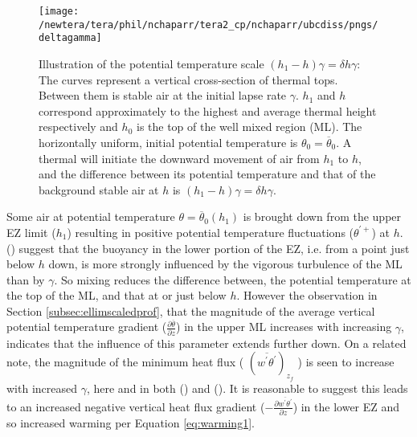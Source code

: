 \begin{figure}[htbp]
    \centering
    \texttt{[image: /newtera/tera/phil/nchaparr/tera2\_cp/nchaparr/ubcdiss/pngs/deltagamma]}
    \caption[Illustration of \acs{EZ} Potential Temperature Scale based on $\gamma$]{Illustration of the potential temperature scale $(h_{1}-h)\gamma = \delta h \gamma$: The curves represent a vertical cross-section of thermal tops.  Between them is stable air at the initial lapse rate $\gamma$. $h_{1}$ and $h$ correspond approximately to the highest and average thermal height respectively and $h_{0}$ is the top of the well mixed region (\acs{ML}).  The horizontally uniform, initial potential temperature is $\theta_{0} = \overline{\theta}_{0}$. A thermal will initiate the downward movement of air from $h_{1}$ to $h$, and the difference between its potential temperature and that of the background stable air at $h$ is $(h_{1}-h)\gamma = \delta h \gamma$.}
    \label{fig:deltagamma}   %
\end{figure}

Some air at potential temperature $\theta = \overline{\theta}_{0}(h_{1})$ is brought down from the upper \acs{EZ} limit ($h_{1}$) resulting in positive potential temperature fluctuations ($\theta^{'+}$) at $h$.\\

\citeauthor{GarciaMellado} (\citeyear{GarciaMellado}) suggest that the buoyancy in the lower portion of the \acs{EZ}, i.e. from a point just below $h$ down, is more strongly influenced by the vigorous turbulence of the \acs{ML} than by $\gamma$.  So mixing reduces the difference between, the potential temperature at the top of the \acs{ML}, and that at or just below $h$.  However the observation in Section \ref{subsec:ellimscaledprof}, that the magnitude of the average vertical potential temperature gradient ($\frac{\partial \overline{\theta}}{\partial z}$) in the upper \acs{ML} increases with increasing $\gamma$, indicates that the influence of this parameter extends further down.  On a related note, the magnitude of the minimum heat flux ( $(\overline{w^{'}\theta^{'}})_{z_{f}}$ ) is seen to increase with increased $\gamma$, here and in both \citeauthor{Sorbjan1} (\citeyear{Sorbjan1}) and \citeauthor{FedConzMir04} (\citeyear{FedConzMir04}).  It is reasonable to suggest this leads to an increased negative vertical heat flux gradient ($-\frac{\partial \overline{w^{'}\theta^{'}}}{\partial z}$) in the lower \acs{EZ} and so increased warming per Equation \ref{eq:warming1}.

